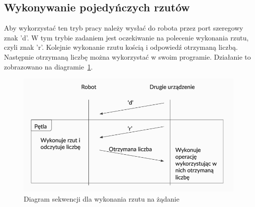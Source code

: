 \subsection{Wykonywanie pojedyńczych rzutów}
Aby wykorzystać ten tryb pracy należy wysłać do robota przez port szeregowy znak 'd'.
W tym trybie zadaniem jest oczekiwanie na polecenie wykonania rzutu, czyli znak 'r'.
Kolejnie wykonanie rzutu kością i odpowiedź otrzymaną liczbą. Następnie otrzymaną liczbę można wykorzystać w swoim programie. Działanie to zobrazowano na diagramie~\ref{fig:interface_b}.

\begin{figure}[H]
    \centering
    \includegraphics[width=0.5\linewidth]{chapters/05-Przetwarzanie Wyniku/figures/InterfaceB}
    \caption{Diagram sekwencji dla wykonania rzutu na żądanie}
    \label{fig:interface_b}
\end{figure}

